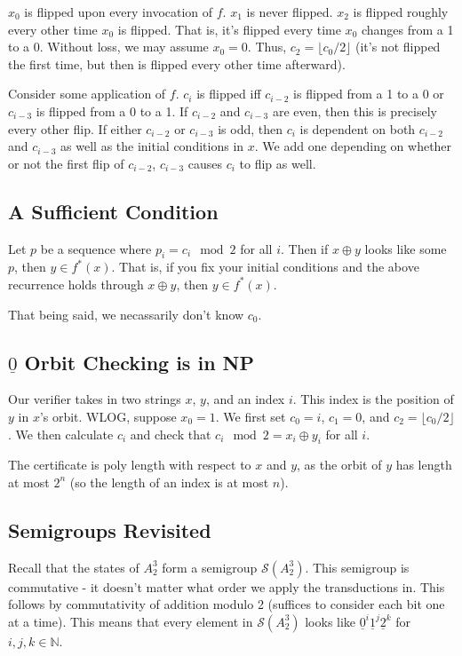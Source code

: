 \documentclass[11pt]{article}
\theoremstyle{pleasant}
\newcommand{\0}{\underline{0}}
\newcommand{\1}{\underline{1}}
\newcommand{\2}{\underline{2}}
\newcommand{\N}{\mathbb{N}}
\renewcommand{\S}{\mathcal{S}}
\begin{document}
$x_0$ is flipped upon every invocation of $f$. $x_1$ is never flipped. $x_2$ is flipped roughly every other time $x_0$ is flipped. That is, it's flipped every time $x_0$ changes from a 1 to a 0. Without loss, we may assume $x_0 = 0$. Thus, $c_2 = \lfloor c_0 / 2 \rfloor$ (it's not flipped the first time, but then is flipped every other time afterward).

Consider some application of $f$. $c_i$ is flipped iff $c_{i-2}$ is flipped from a 1 to a 0 or $c_{i-3}$ is flipped from a 0 to a 1. If $c_{i-2}$ and $c_{i-3}$ are even, then this is precisely every other flip. If either $c_{i-2}$ or $c_{i-3}$ is odd, then $c_i$ is dependent on both $c_{i-2}$ and $c_{i-3}$ as well as the initial conditions in $x$. We add one depending on whether or not the first flip of $c_{i-2}$, $c_{i-3}$ causes $c_i$ to flip as well.

\subsection*{A Sufficient Condition}
Let $p$ be a sequence where $p_i = c_i \mod{2}$ for all $i$. Then if $x \oplus y$ looks like some $p$, then $y \in f^*(x)$. That is, if you fix your initial conditions and the above recurrence holds through $x \oplus y$, then $y \in f^*(x)$.

That being said, we necassarily don't know $c_0$.

\subsection*{$\0$ Orbit Checking is in NP}
Our verifier takes in two strings $x$, $y$, and an index $i$. This index is the position of $y$ in $x$'s orbit. WLOG, suppose $x_0 = 1$. We first set $c_0 = i$, $c_1 = 0$, and $c_2 = \lfloor c_0 / 2 \rfloor$. We then calculate $c_i$ and check that $c_i \mod 2 = x_i \oplus y_i$ for all $i$.

The certificate is poly length with respect to $x$ and $y$, as the orbit of $y$ has length at most $2^n$ (so the length of an index is at most $n$).



\subsection*{Semigroups Revisited}
Recall that the states of $A^3_2$ form a semigroup $\S(A^3_2)$. This semigroup is commutative - it doesn't matter what order we apply the transductions in. This follows by commutativity of addition modulo 2 (suffices to consider each bit one at a time). This means that every element in $\S(A^3_2)$ looks like $\0^i \1^j\2^k$ for $i, j, k \in \N$.
\end{document}
